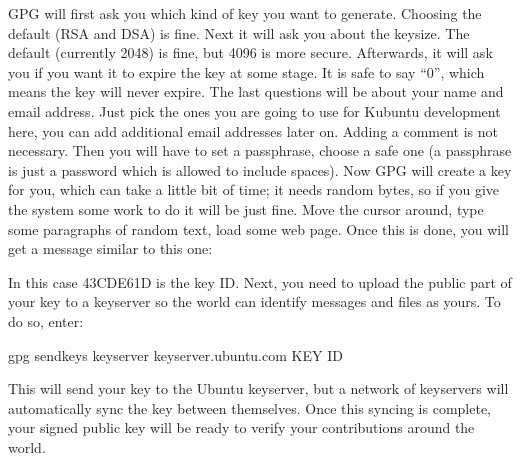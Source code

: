 \documentclass[letterpaper,10pt,english]{sphinxmanual}
\begin{document}
GPG will first ask you which kind of key you want to generate. Choosing the default (RSA and DSA) is fine. Next it will ask you about the keysize. The default (currently 2048) is fine, but 4096 is more secure. Afterwards, it will ask you if you want it to expire the key at some stage. It is safe to say “0”, which means the key will never expire. The last questions will be about your name and email address. Just pick the ones you are going to use for Kubuntu development here, you can add additional email addresses later on. Adding a comment is not necessary. Then you will have to set a passphrase, choose a safe one (a passphrase is just a password which is allowed to include spaces).
Now GPG will create a key for you, which can take a little bit of time; it needs random bytes, so if you give the system some work to do it will be just fine. Move the cursor around, type some paragraphs of random text, load some web page.
Once this is done, you will get a message similar to this one:

\begin{sphinxVerbatim}[commandchars=\\\{\}]
    
                   
     
    
\end{sphinxVerbatim}

In this case 43CDE61D is the key ID.
Next, you need to upload the public part of your key to a keyserver so the world can identify messages and files as yours. To do so, enter:

\begin{sphinxVerbatim}[commandchars=\\\{\}]
\PYGZdl{} gpg \PYGZhy{}\PYGZhy{}send\PYGZhy{}keys \PYGZhy{}\PYGZhy{}keyserver keyserver.ubuntu.com \PYGZlt{}KEY ID\PYGZgt{}
\end{sphinxVerbatim}

This will send your key to the Ubuntu keyserver, but a network of keyservers will automatically sync the key between themselves. Once this syncing is complete, your signed public key will be ready to verify your contributions around the world.
\end{document}
